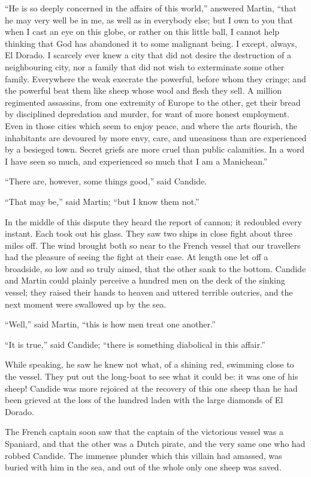 ``He is so deeply concerned in the affairs of this world,'' answered Martin, ``that he may very well be in me, as well as in everybody else; but I own to you that when I cast an eye on this globe, or rather on this little ball, I cannot help thinking that God has abandoned it to some malignant being. I except, always, El Dorado. I scarcely ever knew a city that did not desire the destruction of a neighbouring city, nor a family that did not wish to exterminate some other family. Everywhere the weak execrate the powerful, before whom they cringe; and the powerful beat them like sheep whose wool and flesh they sell. A million regimented assassins, from one extremity of Europe to the other, get their bread by disciplined depredation and murder, for want of more honest employment. Even in those cities which seem to enjoy peace, and where the arts flourish, the inhabitants are devoured by more envy, care, and uneasiness than are experienced by a besieged town. Secret griefs are more cruel than public calamities. In a word I have seen so much, and experienced so much that I am a Manichean.''

``There are, however, some things good,'' said Candide.

``That may be,'' said Martin; ``but I know them not.''

In the middle of this dispute they heard the report of cannon; it redoubled every instant. Each took out his glass. They saw two ships in close fight about three miles off. The wind brought both so near to the French vessel that our travellers had the pleasure of seeing the fight at their ease. At length one let off a broadside, so low and so truly aimed, that the other sank to the bottom. Candide and Martin could plainly perceive a hundred men on the deck of the sinking vessel; they raised their hands to heaven and uttered terrible outcries, and the next moment were swallowed up by the sea.

``Well,'' said Martin, ``this is how men treat one another.''

``It is true,'' said Candide; ``there is something diabolical in this affair.''

While speaking, he saw he knew not what, of a shining red, swimming close to the vessel. They put out the long-boat to see what it could be: it was one of his sheep! Candide was more rejoiced at the recovery of this one sheep than he had been grieved at the loss of the hundred laden with the large diamonds of El Dorado.

The French captain soon saw that the captain of the victorious vessel was a Spaniard, and that the other was a Dutch pirate, and the very same one who had robbed Candide. The immense plunder which this villain had amassed, was buried with him in the sea, and out of the whole only one sheep was saved.

